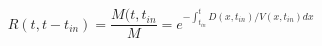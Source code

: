 \begin{equation}
R(t,t-t_{in}) = \frac{M(t,t_{in}}{M} = e^{-\int_{t_{in}}^t D(x,t_{in})/V(x,t_{in}) dx}
\end{equation}
